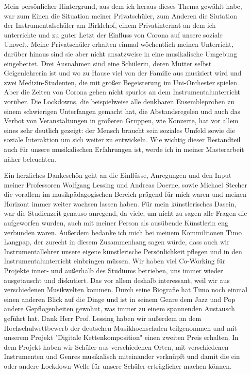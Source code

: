 
Mein persönlicher Hintergrund, aus dem ich heraus dieses Thema gewählt habe, war
zum Einen die Situation meiner Privatschüler, zum Anderen die Siutation der
Instrumentalschüler am Birklehof, einem Privatinternat an dem ich unterrichte und zu guter Letzt der Einfluss von Corona auf
unsere soziale Umwelt. Meine Privatschüler erhalten einmal wöchentlich meinen
Unterricht, darüber hinaus sind sie aber nicht ansatzweise in eine musikalische
Umgebung eingebettet. Drei Ausnahmen sind eine Schülerin, deren Mutter
selbst Geigenlehrerin ist und wo zu Hause viel von der Familie aus musiziert wird und zwei
Medizin-Studenten, die mit großer Begeisterung im Uni-Orchester spielen. 
Aber die Zeiten von Corona gehen nicht spurlos an dem Instrumentalunterricht
vorüber. Die Lockdowns, die beispielweise alle denkbaren Ensembleproben zu einem
schwierigen Unterfangen gemacht hat, die Abstandsregelen und auch das Verbot von Veranstaltungen
in größeren Gruppen, wie Konzerte, hat vor allem eines sehr deutlich gezeigt: der Mensch
braucht sein soziales Umfeld sowie die soziale Interaktion um sich weiter zu
entwickeln. Wie wichtig dieser Bestandteil auch für unsere musikalischen
Erfahrungen ist, werde ich in meiner Masterarbeit näher beleuchten.

Ein herzliches Dankeschön geht an die Einflüsse, Anregungen und den Input meiner Professoren Wolfgang
Lessing und Andreas Doerne, sowie Michael Stecher die vorallem im musikpädagogischen Bereich prägend
für mich waren und meinen Horizont immer weiter wachsen lassen haben. Für mein
künstlerisches Dasein, war die Studienzeit genauso anregend, da viele, um
nicht zu sagen alle Fragen die aufgeworfen wurden, auch mit meiner Person als
ausübende Künstlerin eng verbunden waren. Außerdem bedanke ich mich bei meinem
Kommilitonen Timo
Langpap, der zurecht in diesem Zusammenhang sagen würde, dass auch wir
Instrumentallehrer unsere eigene künstlerische Persönlichkeit pflegen und in
den Instrumentalunterricht einbringen müssen. Wir haben viel Co-Working für
Projekte inner- und außerhalb des Studiums
betrieben, uns immer wieder ausgetauscht und diskutiert. Das vor allem deshalb
interessant, weil wir aus verschiedenen Musikwelten kommen. Durch seine Biografie
hat Timo noch einmal einen anderen Blick auf die Dinge und ist in seinem Genre dem
Jazz und Pop andere Gepflogenheiten gewohnt, was immer zu einem
spannenden Austausch geführt hat. Dank Herr Prof. Lessing haben wir außerdem an dem Hochschulwettbewerb der deutschen Musikhochschulen teilgenommen
und mit unserem Projekt "Digitale Kettenkomposition" einen zweiten Preis
erhalten. In dem Projekt haben wir Schüler aus verschiedenen Orten, mit
verschiedenen Instrumenten und Genres musikalisch miteinander verknüpft und
damit die ein oder andere Lockdown-Welle für unsere Schüler erträglicher machen können. 

